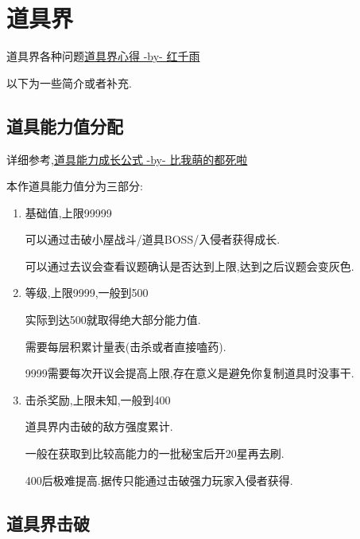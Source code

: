 	
	\newpage

	\section{道具界}

	道具界各种问题\href{http://tieba.baidu.com/p/3730196003}{道具界心得 -by- 红千雨}

	以下为一些简介或者补充.

	\subsection{道具能力值分配}
	
	详细参考,\href{http://tieba.baidu.com/f?kz=3834692385}{道具能力成长公式 -by- 比我萌的都死啦}

	本作道具能力值分为三部分:

	\begin{enumerate}

		\item 
		基础值,上限99999

		可以通过击破小屋战斗/道具BOSS/入侵者获得成长.

		可以通过去议会查看议题确认是否达到上限,达到之后议题会变灰色.

		\item
		等级,上限9999,一般到500

		实际到达500就取得绝大部分能力值.

		需要每层积累计量表(击杀或者直接嗑药).

		9999需要每次开议会提高上限,存在意义是避免你复制道具时没事干.

		\item
		击杀奖励,上限未知,一般到400

		道具界内击破的敌方强度累计.

		一般在获取到比较高能力的一批秘宝后开20星再去刷.

		400后极难提高.据传只能通过击破强力玩家入侵者获得.

	\end{enumerate}
	
	\newpage

	\subsection{道具界击破}


